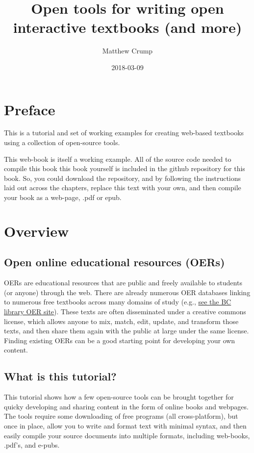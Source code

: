 \documentclass[]{book}
\title{Open tools for writing open interactive textbooks (and more)}
\author{Matthew Crump}
\date{2018-03-09}
\theoremstyle{definition}
\theoremstyle{definition}
\theoremstyle{definition}
\theoremstyle{remark}
\begin{document}
\maketitle

{
\setcounter{tocdepth}{1}
\tableofcontents
}
\chapter*{Preface}\label{preface}

This is a tutorial and set of working examples for creating web-based
textbooks using a collection of open-source tools.

This web-book is itself a working example. All of the source code needed
to compile this book this book yourself is included in the github
repository for this book. So, you could download the repository, and by
following the instructions laid out across the chapters, replace this
text with your own, and then compile your book as a web-page, .pdf or
epub.

\chapter{Overview}\label{overview}

\section{Open online educational resources
(OERs)}\label{open-online-educational-resources-oers}

OERs are educational resources that are public and freely available to
students (or anyone) through the web. There are already numerous OER
databases linking to numerous free textbooks across many domains of
study (e.g., \href{http://libguides.brooklyn.cuny.edu/research/oer}{see
the BC library OER site}). These texts are often disseminated under a
creative commons license, which allows anyone to mix, match, edit,
update, and transform those texts, and then share them again with the
public at large under the same license. Finding existing OERs can be a
good starting point for developing your own content.

\section{What is this tutorial?}\label{what-is-this-tutorial}

This tutorial shows how a few open-source tools can be brought together
for quicky developing and sharing content in the form of online books
and webpages. The tools require some downloading of free programs (all
cross-platform), but once in place, allow you to write and format text
with minimal syntax, and then easily compile your source documents into
multiple formats, including web-books, .pdf's, and e-pubs.
\end{document}
